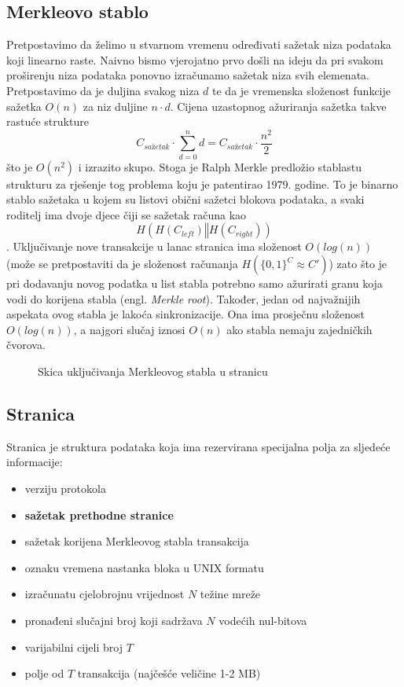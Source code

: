 \documentclass[utf8, zavrsni]{fer}
\begin{document}
\subsection{Merkleovo stablo}
\label{merkle}
Pretpostavimo da želimo u stvarnom vremenu određivati sažetak niza podataka koji linearno raste. Naivno bismo vjerojatno prvo došli na ideju da pri svakom proširenju niza podataka ponovno izračunamo sažetak niza svih elemenata. Pretpostavimo da je duljina svakog niza $d$ te da je vremenska složenost funkcije sažetka $O(n)$ za niz duljine $n \cdot d$. Cijena uzastopnog ažuriranja sažetka takve rastuće strukture
$$
C_{sažetak} \cdot \sum_{d=0}^{n} d = C_{sažetak} \cdot \frac{n^2}{2}
$$
što je $O(n^2)$ i izrazito skupo. Stoga je Ralph Merkle predložio stablastu strukturu za rješenje tog problema koju je patentirao 1979. godine. To je binarno stablo sažetaka u kojem su listovi obični sažetci blokova podataka, a svaki roditelj ima dvoje djece čiji se sažetak računa kao $$ H(H(C_{left}) \mathbin\Vert H(C_{right})) $$.
Uključivanje nove transakcije u lanac stranica ima složenost $O(log(n))$ (može se pretpostaviti da je složenost računanja $H(\{0,1\}^C \approx C')$) zato što je pri dodavanju novog podatka u list stabla potrebno samo ažurirati granu koja vodi do korijena stabla (engl. \textit{Merkle root}). Također, jedan od najvažnijih aspekata ovog stabla je lakoća sinkronizacije. Ona ima prosječnu složenost $O(log(n))$, a najgori slučaj iznosi $O(n)$ ako stabla nemaju zajedničkih čvorova.
\begin{figure}[H]
    \label{chainscheme}
    \resizebox{\textwidth}{!}{%
    
    }%
    \caption{Skica uključivanja Merkleovog stabla u stranicu}
\end{figure}

\subsection{Stranica}
Stranica je struktura podataka koja ima rezervirana specijalna polja za sljedeće informacije:
\begin{itemize}
    \item verziju protokola
    \item \textbf{sažetak prethodne stranice}
    \item sažetak korijena Merkleovog stabla transakcija
    \item oznaku vremena nastanka bloka u UNIX formatu
    \item izračunatu cjelobrojnu vrijednost $ N $ težine mreže
    \item pronađeni slučajni broj koji sadržava $ N $ vodećih nul-bitova
    \item varijabilni cijeli broj $ T $
    \item polje od $ T $ transakcija (najčešće veličine 1-2 MB)
\end{itemize}
\end{document}
